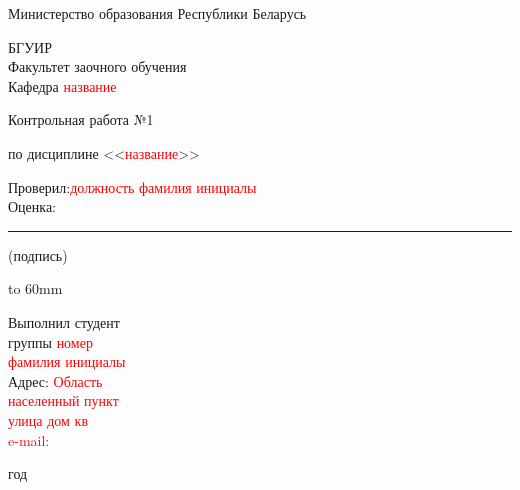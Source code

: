 \documentclass[a4paper,14pt]{scrartcl}
\begin{document}
\begin{titlepage}
\begin{center}Министерство образования Республики Беларусь

\vspace{2ex}
БГУИР
\vspace{2ex}
\\Факультет заочного обучения
\vspace{2ex}
\\Кафедра \textcolor{red}{название}

\vspace{6ex}
{\LARGE Контрольная работа №1}

\vspace{4ex}
{\Large по дисциплине <<\textcolor{red}{название}>>} 

\end{center}
\vspace{10ex}
\hfill\parbox{6cm}{
Проверил:\textcolor{red}{должность фамилия инициалы}\\
Оценка:\hrulefill
\\[2pt]
\medskip\hrule\medskip
\centerline {\footnotesize(подпись)}

{\hbox to 60mm{\quad\hrulefill {}}}
}
\vspace{4ex}

\begin{flushleft}

Выполнил студент\\ 
группы \textcolor{red}{номер}\\
\textcolor{red}{фамилия инициалы}  \\
{\footnotesize 
Адрес: \textcolor{red}{Область\\ населенный пункт\\ улица дом кв\\
e-mail:}\\} \end{flushleft}

\vspace{43mm}
\begin{center}
год
\end{center}
\clearpage
\end{titlepage}
\end{document}
